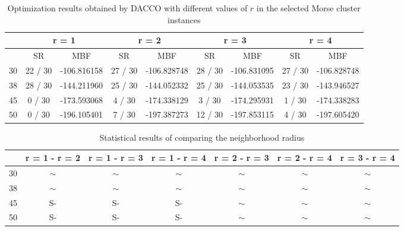		
		
		
		\begin{landscape}
			 \begin{table}[!htdp]
					\begin{center}
						\begin{tabular}{| c | c | c | c | c | c | c | c | c |}
							\hline
							~ & \multicolumn{2}{c|}{\textbf{r = 1}} & \multicolumn{2}{c|}{\textbf{r = 2}} & \multicolumn{2}{c|}{\textbf{r = 3}} & \multicolumn{2}{c|}{\textbf{r = 4}} \\ \hline
							~ & SR & MBF & SR & MBF & SR & MBF & SR & MBF \\ \hline
							30 & 22 / 30 & -106.816158 & 27 / 30 & -106.828748 & 28 / 30 & -106.831095 & 27 / 30 & -106.828748 \\ \hline
							38 & 28 / 30 & -144.211960 & 25 / 30 & -144.052332 & 25 / 30 & -144.053535 & 23 / 30 & -143.946527 \\ \hline
							45 & 0 / 30 & -173.593068 & 4 / 30 & -174.338129 & 3 / 30 & -174.295931& 1 / 30 & -174.338283 \\ \hline
							50 & 0 / 30 & -196.105401 & 7 / 30 & -197.387273 & 12 / 30 & -197.853115 & 4 / 30 & -197.605420 \\ \hline
						\end{tabular}
						\caption{Optimization results obtained by DACCO with different values of $r$ in the selected Morse cluster instances}
						\label{tab:neighborhood_radius_results}
					\end{center}
			\end{table}
		
			\begin{table}[!htdp]
					\begin{center}
						\begin{tabular}{| c | c | c | c | c | c | c |}
							\hline
							~& \textbf{r = 1 - r = 2} & \textbf{r = 1 - r = 3} & \textbf{r = 1 - r = 4} & \textbf{r = 2 - r = 3} & \textbf{r = 2 - r = 4} & \textbf{r = 3 - r = 4} \\ \hline
							30 & $\sim$ & $\sim$ & $\sim$ & $\sim$ & $\sim$ & $\sim$ \\ \hline
							38 & $\sim$ & $\sim$ & $\sim$ & $\sim$ & $\sim$ & $\sim$ \\ \hline
							45 & S- & S- & S- & $\sim$ & $\sim$ & $\sim$ \\ \hline
							50 & S- & S- & S- & $\sim$ & $\sim$ & $\sim$ \\ \hline
						\end{tabular}
						\caption{Statistical results of comparing the neighborhood radius}
						\label{tab:statistical_comparison_radius}
					\end{center}
			\end{table}
			
			\end{landscape}
			
